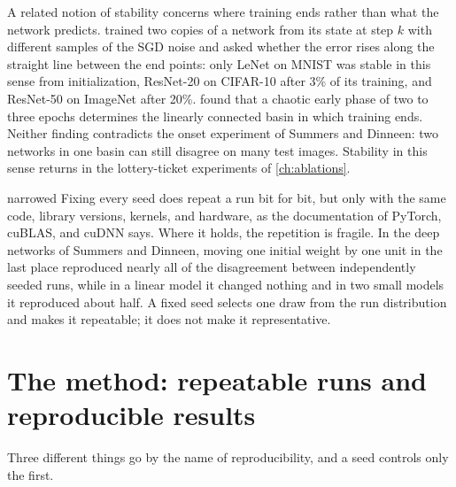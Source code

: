 \begin{refsection}
A related notion of stability concerns where training ends rather than what the network predicts. \Textcite{FrankleEtAl2020} trained two copies of a network from its state at step $k$ with different samples of the SGD noise and asked whether the error rises along the straight line between the end points: only LeNet on MNIST was stable in this sense from initialization, ResNet-20 on CIFAR-10 after 3\% of its training, and ResNet-50 on ImageNet after 20\%. \Textcite{FortEtAl2020} found that a chaotic early phase of two to three epochs determines the linearly connected basin in which training ends. Neither finding contradicts the onset experiment of Summers and Dinneen: two networks in one basin can still disagree on many test images. Stability in this sense returns in the lottery-ticket experiments of \cref{ch:ablations}.

\begin{verdict}{narrowed}
Fixing every seed does repeat a run bit for bit, but only with the same code, library versions, kernels, and hardware, as the documentation of PyTorch, cuBLAS, and cuDNN says. Where it holds, the repetition is fragile. In the deep networks of Summers and Dinneen, moving one initial weight by one unit in the last place reproduced nearly all of the disagreement between independently seeded runs, while in a linear model it changed nothing and in two small models it reproduced about half. A fixed seed selects one draw from the run distribution and makes it repeatable; it does not make it representative.
\end{verdict}

\section{The method: repeatable runs and reproducible results}\label{sec:instability:levels}

Three different things go by the name of reproducibility, and a seed controls only the first.


\end{refsection}
